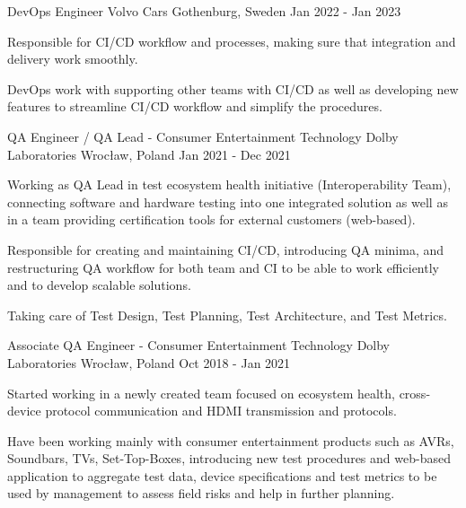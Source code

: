 \begin{cventries}
  \cventry
    {DevOps Engineer} %
    {Volvo Cars} %
    {Gothenburg, Sweden} %
    {Jan 2022 - Jan 2023} %
    {
      \begin{cvitems} %
        \item {Responsible for CI/CD workflow and processes, making sure that integration and delivery work smoothly.}
        \item {DevOps work with supporting other teams with CI/CD as well as developing new features to streamline CI/CD workflow and simplify the procedures.}
      \end{cvitems}
    }

  \cventry
    {QA Engineer / QA Lead - Consumer Entertainment Technology} %
    {Dolby Laboratories} %
    {Wrocław, Poland} %
    {Jan 2021 - Dec 2021} %
    {
      \begin{cvitems} %
        \item {Working as QA Lead in test ecosystem health initiative (Interoperability Team), connecting software and hardware testing into one integrated solution as well as in a team providing certification tools for external customers (web-based).}
        \item {Responsible for creating and maintaining CI/CD, introducing QA minima, and restructuring QA workflow for both team and CI to be able to work efficiently and to develop scalable solutions.}
        \item {Taking care of Test Design, Test Planning, Test Architecture, and Test Metrics.}
      \end{cvitems}
    }

  \cventry
    {Associate QA Engineer - Consumer Entertainment Technology} %
    {Dolby Laboratories} %
    {Wrocław, Poland} %
    {Oct 2018 - Jan 2021} %
    {
      \begin{cvitems} %
        \item {Started working in a newly created team focused on ecosystem health, cross-device protocol communication and HDMI transmission and protocols.}
        \item {Have been working mainly with consumer entertainment products such as AVRs, Soundbars, TVs, Set-Top-Boxes, introducing new test procedures and web-based application to aggregate test data, device specifications and test metrics to be used by management to assess field risks and help in further planning.}
      \end{cvitems}
    }


\end{cventries}
